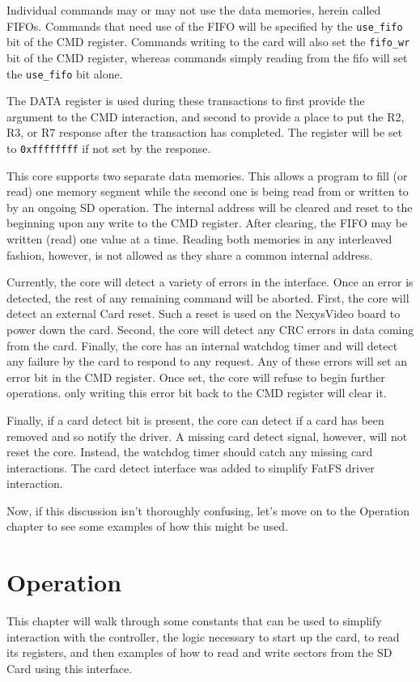 \documentclass{gqtekspec}
\begin{document}
Individual commands may or may not use the data memories, herein called
FIFOs.  Commands that need
use of the FIFO will be specified by the {\tt use\_fifo} bit of the CMD
register.  Commands writing to the card will also set the {\tt fifo\_wr} bit
of the CMD register, whereas commands simply reading from the fifo will set the
{\tt use\_fifo} bit alone.

The DATA register is used during these transactions to first provide the 
argument to the CMD interaction, and second to provide a place to put the
R2, R3, or R7 response after the transaction has completed.  The register will
be set to {\tt 0xffffffff} if not set by the response.

This core supports two separate data memories.  This allows a program to
fill (or read) one memory segment while the second one is being read from or
written to by an ongoing SD operation.
The internal address will be cleared and reset to the beginning
upon any write to the CMD register.  After clearing, the FIFO may be written
(read) one value at a time.  Reading both memories in any interleaved fashion,
however, is not allowed as they share a common internal address.

Currently, the core will detect a variety of errors in the interface.  Once an
error is detected, the rest of any remaining command will be aborted.  First,
the core will detect an external Card reset.  Such a reset is used on the
NexysVideo board to power down the card.  Second, the core will detect any
CRC errors in data coming from the card.  Finally, the core has an internal
watchdog timer and will detect any failure by the card to respond to any
request.  Any of these errors will set an error bit in the CMD register.
Once set, the core will refuse to begin further operations.  only writing
this error bit back to the CMD register will clear it.

Finally, if a card detect bit is present, the core can detect if a card has
been removed and so notify the driver.  A missing card detect signal, however,
will not reset the core.  Instead, the watchdog timer should catch any missing
card interactions.  The card detect interface was added to simplify
FatFS driver interaction.

Now, if this discussion isn't thoroughly confusing, let's move on to the 
Operation chapter to see some examples of how this might be used.

\chapter{Operation}\label{ch:ops}
This chapter will walk through some constants that can be used to simplify
interaction with the controller, the logic necessary to start up the card,
to read its registers, and then examples of how to read and write sectors
from the SD Card using this interface.
\end{document}
